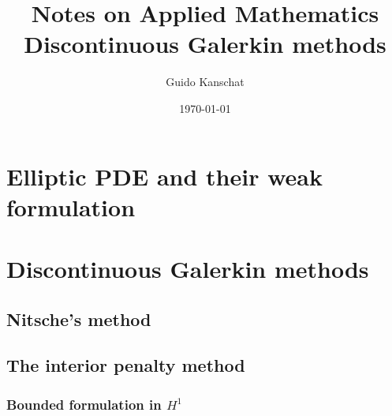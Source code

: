 \documentclass[USenglish,12pt]{report}
\title{\textbf{Notes on Applied Mathematics}
\\[5mm]
{\large Discontinuous Galerkin methods}}
\author{Guido Kanschat}
\date{\today}
\begin{document}
\maketitle

\chapter{Elliptic PDE and their weak formulation}


\chapter{Discontinuous Galerkin methods}
\section{Nitsche's method}
\label{sec:nitsches-method}


\section{The interior penalty method}
\label{sec:interior-penalty}

\subsection{Bounded formulation in $H^1$}

\end{document}
